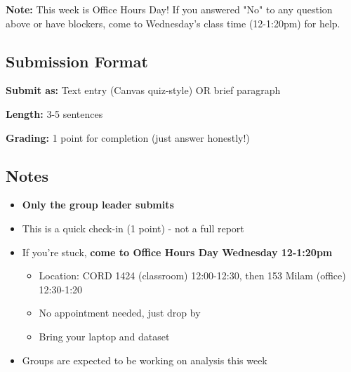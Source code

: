 \documentclass[10pt]{article}
\begin{document}
\vspace{6pt}

\textbf{Note:} This week is Office Hours Day! If you answered "No" to any question above or have blockers, come to Wednesday's class time (12-1:20pm) for help.

\subsection*{Submission Format}

\textbf{Submit as:} Text entry (Canvas quiz-style) OR brief paragraph

\textbf{Length:} 3-5 sentences

\textbf{Grading:} 1 point for completion (just answer honestly!)

\subsection*{Notes}

\begin{itemize}[leftmargin=20pt]
\item \textbf{Only the group leader submits}
\item This is a quick check-in (1 point) - not a full report
\item If you're stuck, \textbf{come to Office Hours Day Wednesday 12-1:20pm}
\begin{itemize}[label=--]
\item Location: CORD 1424 (classroom) 12:00-12:30, then 153 Milam (office) 12:30-1:20
\item No appointment needed, just drop by
\item Bring your laptop and dataset
\end{itemize}
\item Groups are expected to be working on analysis this week
\end{itemize}
\end{document}
